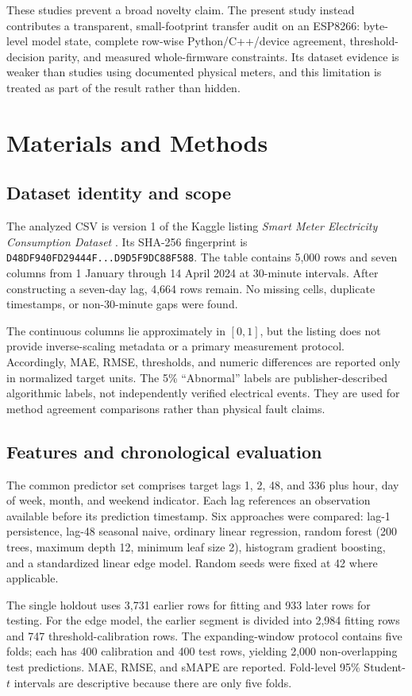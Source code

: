 \documentclass[10pt,a4paper,twocolumn]{article}
\begin{document}
These studies prevent a broad novelty claim. The present study instead contributes a transparent, small-footprint transfer audit on an ESP8266: byte-level model state, complete row-wise Python/C++/device agreement, threshold-decision parity, and measured whole-firmware constraints. Its dataset evidence is weaker than studies using documented physical meters, and this limitation is treated as part of the result rather than hidden.

\section{Materials and Methods}
\subsection{Dataset identity and scope}
The analyzed CSV is version 1 of the Kaggle listing \emph{Smart Meter Electricity Consumption Dataset} \cite{kaggleSmartMeter2024}. Its SHA-256 fingerprint is \texttt{D48DF940FD29444F...D9D5F9DC88F588}. The table contains 5,000 rows and seven columns from 1 January through 14 April 2024 at 30-minute intervals. After constructing a seven-day lag, 4,664 rows remain. No missing cells, duplicate timestamps, or non-30-minute gaps were found.

The continuous columns lie approximately in $[0,1]$, but the listing does not provide inverse-scaling metadata or a primary measurement protocol. Accordingly, MAE, RMSE, thresholds, and numeric differences are reported only in normalized target units. The 5\% ``Abnormal'' labels are publisher-described algorithmic labels, not independently verified electrical events. They are used for method agreement comparisons rather than physical fault claims.

\subsection{Features and chronological evaluation}
The common predictor set comprises target lags 1, 2, 48, and 336 plus hour, day of week, month, and weekend indicator. Each lag references an observation available before its prediction timestamp. Six approaches were compared: lag-1 persistence, lag-48 seasonal naive, ordinary linear regression, random forest (200 trees, maximum depth 12, minimum leaf size 2), histogram gradient boosting, and a standardized linear edge model. Random seeds were fixed at 42 where applicable.

The single holdout uses 3,731 earlier rows for fitting and 933 later rows for testing. For the edge model, the earlier segment is divided into 2,984 fitting rows and 747 threshold-calibration rows. The expanding-window protocol contains five folds; each has 400 calibration and 400 test rows, yielding 2,000 non-overlapping test predictions. MAE, RMSE, and sMAPE are reported. Fold-level 95\% Student-$t$ intervals are descriptive because there are only five folds.
\end{document}
